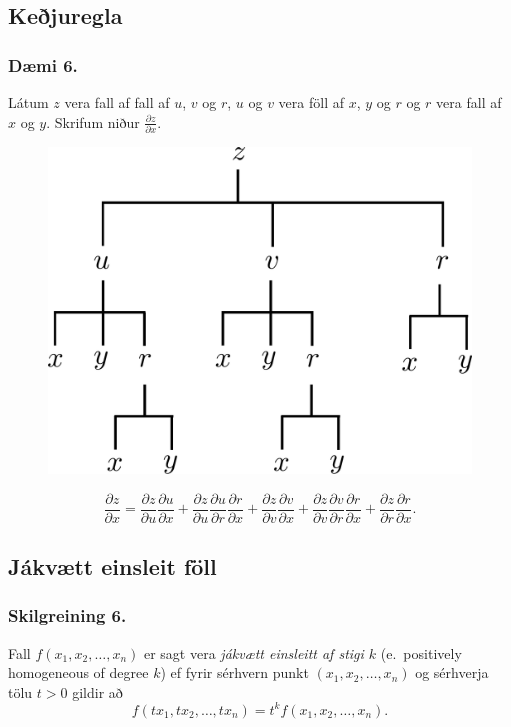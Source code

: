 \subsection{Keðjuregla} 

\subsubsection{Dæmi 6.}
Látum $z$ vera fall af fall af $u$, $v$ og $r$, $u$ og $v$ vera föll af $x$, $y$ og $r$ og $r$ vera fall af $x$ og $y$. Skrifum niður $\frac{\partial z}{\partial x}$.

\begin{figure}[h!]
           \centering
            \includegraphics[width=0.45\linewidth]{chain4}
    \end{figure}
$$\frac{\partial z}{\partial x} = \frac{\partial z}{\partial u} \frac{\partial u}{\partial x} +\frac{\partial z}{\partial u} \frac{\partial u}{\partial r} \frac{\partial r}{\partial x} 
+ \frac{\partial z}{\partial v} \frac{\partial v}{\partial x} + \frac{\partial z}{\partial v} \frac{\partial v}{\partial r} \frac{\partial r}{\partial x} +\frac{\partial z}{\partial r} \frac{\partial r}{\partial x}.$$




\subsection{Jákvætt einsleit föll} 

\subsubsection{Skilgreining 6.}

Fall $f(x_1, x_2, \ldots, x_n)$ er sagt vera {\em jákvætt einsleitt af stigi $k$} (e.~positively homogeneous of degree $k$) ef fyrir sérhvern punkt $(x_1, x_2, \ldots, x_n)$ og sérhverja tölu $t>0$ gildir að 
$$f(tx_1, tx_2, \ldots, tx_n)=t^kf(x_1, x_2, \ldots, x_n).$$






